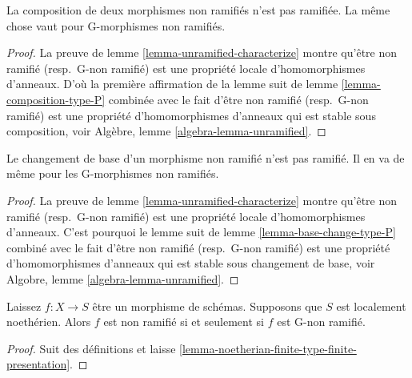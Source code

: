 \begin{lemma}

\label{lemma-composition-unramified}

La composition de deux morphismes non ramifiés n'est pas ramifiée. La même chose vaut pour G-morphismes non ramifiés.

\end{lemma}

\begin{proof}
La preuve de lemme \ref{lemma-unramified-characterize} montre qu'être non ramifié (resp.\ G-non ramifié) est une propriété locale d'homomorphismes d'anneaux. D'où la première affirmation de la lemme suit de lemme \ref{lemma-composition-type-P} combinée avec le fait d'être non ramifié (resp.\ G-non ramifié) est une propriété d'homomorphismes d'anneaux qui est stable sous composition, voir Algèbre, lemme \ref{algebra-lemma-unramified}.
\end{proof}

\begin{lemma}

\label{lemma-base-change-unramified}

Le changement de base d'un morphisme non ramifié n'est pas ramifié. Il en va de même pour les G-morphismes non ramifiés.

\end{lemma}

\begin{proof}
La preuve de lemme \ref{lemma-unramified-characterize} montre qu'être non ramifié (resp.\ G-non ramifié) est une propriété locale d'homomorphismes d'anneaux. C'est pourquoi le lemme suit de lemme \ref{lemma-base-change-type-P} combiné avec le fait d'être non ramifié (resp.\ G-non ramifié) est une propriété d'homomorphismes d'anneaux qui est stable sous changement de base, voir Algobre, lemme \ref{algebra-lemma-unramified}.
\end{proof}

\begin{lemma}

\label{lemma-noetherian-unramified}
Laissez $f : X \to S$ être un morphisme de schémas. Supposons que $S$ est localement noethérien. Alors $f$ est non ramifié si et seulement si $f$ est G-non ramifié.
\end{lemma}

\begin{proof}
Suit des définitions et laisse \ref{lemma-noetherian-finite-type-finite-presentation}.
\end{proof}

